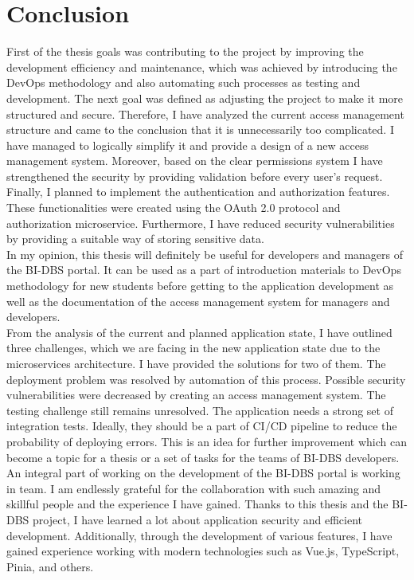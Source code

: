\chapter{Conclusion} First of the thesis goals was contributing to the project by improving the development efficiency and maintenance, which was achieved by introducing the DevOps methodology and also automating such processes as testing and development. The next goal was defined as adjusting the project to make it more structured and secure. Therefore, I have analyzed the current access management structure and came to the conclusion that it is unnecessarily too complicated. I have managed to logically simplify it and provide a design of a new access management system. Moreover, based on the clear permissions system I have strengthened the security by providing validation before every user's request. Finally, I planned to implement the authentication and authorization features. These functionalities were created using the OAuth 2.0 protocol and authorization microservice. Furthermore, I have reduced security vulnerabilities by providing a suitable way of storing sensitive data.\\
In my opinion, this thesis will definitely be useful for developers and managers of the BI-DBS portal. It can be used as a part of introduction materials to DevOps methodology for new students before getting to the application development as well as the documentation of the access management system for managers and developers.\\
From the analysis of the current and planned application state, I have outlined three challenges, which we are facing in the new application state due to the microservices architecture. I have provided the solutions for two of them. The deployment problem was resolved by automation of this process. Possible security vulnerabilities were decreased by creating an access management system. The testing challenge still remains unresolved. The application needs a strong set of integration tests. Ideally, they should be a part of CI/CD pipeline to reduce the probability of deploying errors. This is an idea for further improvement which can become a topic for a thesis or a set of tasks for the teams of BI-DBS developers.\\
An integral part of working on the development of the BI-DBS portal is working in team. I am endlessly grateful for the collaboration with such amazing and skillful people and the experience I have gained. Thanks to this thesis and the BI-DBS project, I have learned a lot about application security and efficient development. Additionally, through the development of various features, I have gained experience working with modern technologies such as Vue.js, TypeScript, Pinia, and others.